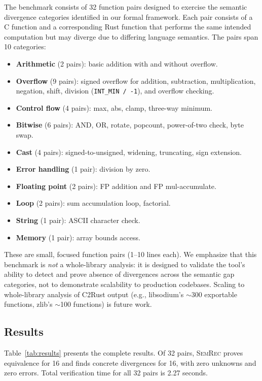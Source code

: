 \documentclass[11pt]{article}
\begin{document}
The benchmark consists of 32 function pairs designed to exercise the semantic divergence categories identified in our formal framework. Each pair consists of a C function and a corresponding Rust function that performs the same intended computation but may diverge due to differing language semantics. The pairs span 10 categories:

\begin{itemize}[leftmargin=*]
  \item \textbf{Arithmetic} (2 pairs): basic addition with and without overflow.
  \item \textbf{Overflow} (9 pairs): signed overflow for addition, subtraction, multiplication, negation, shift, division (\texttt{INT\_MIN / -1}), and overflow checking.
  \item \textbf{Control flow} (4 pairs): max, abs, clamp, three-way minimum.
  \item \textbf{Bitwise} (6 pairs): AND, OR, rotate, popcount, power-of-two check, byte swap.
  \item \textbf{Cast} (4 pairs): signed-to-unsigned, widening, truncating, sign extension.
  \item \textbf{Error handling} (1 pair): division by zero.
  \item \textbf{Floating point} (2 pairs): FP addition and FP mul-accumulate.
  \item \textbf{Loop} (2 pairs): sum accumulation loop, factorial.
  \item \textbf{String} (1 pair): ASCII character check.
  \item \textbf{Memory} (1 pair): array bounds access.
\end{itemize}

These are small, focused function pairs (1--10 lines each). We emphasize that this benchmark is \emph{not} a whole-library analysis: it is designed to validate the tool's ability to detect and prove absence of divergences across the semantic gap categories, not to demonstrate scalability to production codebases. Scaling to whole-library analysis of C2Rust output (e.g., libsodium's $\sim$300 exportable functions, zlib's $\sim$100 functions) is future work.


\subsection{Results}
\label{sec:eval-results}

Table~\ref{tab:results} presents the complete results. Of 32 pairs, \textsc{SemRec} proves equivalence for 16 and finds concrete divergences for 16, with zero unknowns and zero errors. Total verification time for all 32 pairs is 2.27 seconds.
\end{document}
